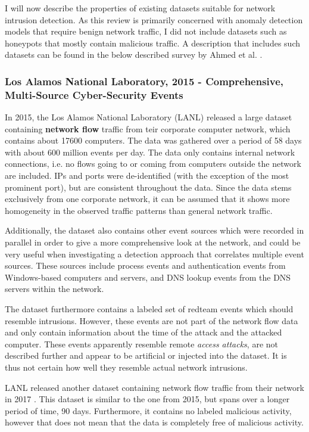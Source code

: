 \documentclass[a4paper,12pt,twoside]{report}
\begin{document}
I will now describe the properties of existing datasets suitable for network intrusion detection. As this review is primarily concerned with anomaly detection models that require benign network traffic, I did not include datasets such as honeypots that mostly contain malicious traffic. A description that includes such datasets can be found in the below described survey by Ahmed et al. \cite{ahmed2016survey}.



\subsubsection*{Los Alamos National Laboratory, 2015 - Comprehensive, Multi-Source Cyber-Security Events \cite{akent-2015-enterprise-data}\cite{kent-2015-cyberdata1}}

In 2015, the Los Alamos National Laboratory (LANL) released a large dataset containing \textbf{network flow} traffic from teir corporate computer network, which contains about 17600 computers. The data was gathered over a period of 58 days with about 600 million events per day. The data only contains internal network connections, i.e. no flows going to or coming from computers outside the network are included. IPs and ports were de-identified (with the exception of the most prominent port), but are consistent throughout the data. Since the data stems exclusively from one corporate network, it can be assumed that it shows more homogeneity in the observed traffic patterns than  general network traffic.

Additionally, the dataset also contains other event sources which were recorded in parallel in order to give a more comprehensive look at the network, and could be very useful when investigating a detection approach that correlates multiple event sources. These sources include process events and authentication events from Windows-based computers and servers, and DNS lookup events from the DNS servers within the network. 

The dataset furthermore contains a labeled set of redteam events which should resemble intrusions. However, these events are not part of the network flow data and only contain information about the time of the attack and the attacked computer. These events apparently resemble remote \textit{access attacks}, are not described further and appear to be artificial or injected into the dataset. It is thus not certain how well they resemble actual network intrusions.


LANL released another dataset containing network flow traffic from their network in 2017 \cite{turcotte17}. This dataset is similar to the one from 2015, but spans over a longer period of time, 90 days. Furthermore, it contains no labeled malicious activity,  however that does not mean that the data is completely free of malicious activity.
\end{document}
